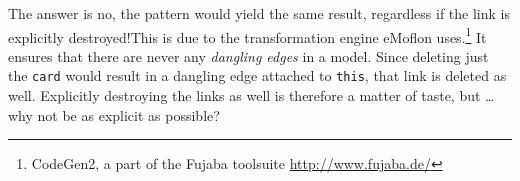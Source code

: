 The answer is no, the pattern would yield the same result, regardless if the link is explicitly destroyed!This is due to the
transformation engine eMoflon uses.\footnote{CodeGen2, a part of the Fujaba toolsuite \url{http://www.fujaba.de/}} It ensures that there are never any
\emph{dangling edges} in a model. Since deleting just the \texttt{card} would result in a dangling edge attached to \texttt{this}, that link is deleted as well. Explicitly
destroying the links as well is therefore a matter of taste, but \ldots why not be as explicit as possible?





